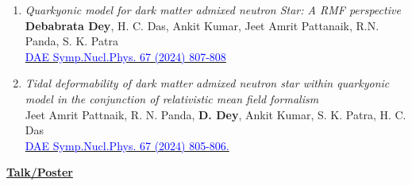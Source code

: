 \begin{enumerate}
\item \textit\textit{Quarkyonic model for dark matter admixed neutron Star: A RMF perspective}\\
\textbf{Debabrata Dey}, H. C. Das, Ankit Kumar, Jeet Amrit Pattanaik, R.N. Panda, S. K. Patra\\
\href{https://link.springer.com/chapter/10.1007/978-981-95-1513-4_51}{\textcolor{blue}{DAE Symp.Nucl.Phys. 67 (2024) 807-808 }}

\item \textit\textit{Tidal deformability of dark matter admixed neutron star within quarkyonic model in the conjunction of relativistic mean field formalism}\\
Jeet Amrit Pattnaik, R. N. Panda, \textbf{D. Dey}, Ankit Kumar, S. K. Patra, H. C. Das\\
\href{https://sympnp.org/proceedings/}{\textcolor{blue}{DAE Symp.Nucl.Phys. 67 (2024) 805-806.}}

\end{enumerate}
\textbf{\large\underline{Talk/Poster}}
